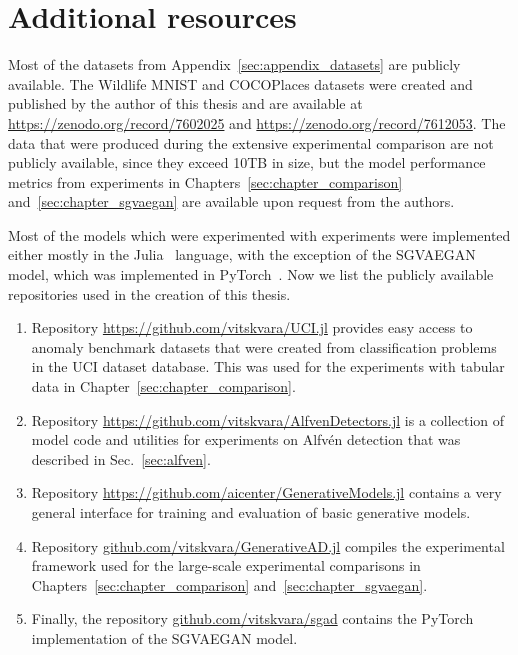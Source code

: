 \chapter{Additional resources} \label{sec:appendix_links}

Most of the datasets from Appendix~\ref{sec:appendix_datasets} are publicly available. The Wildlife MNIST and COCOPlaces datasets were created and published by the author of this thesis and are available at \url{https://zenodo.org/record/7602025} and \url{https://zenodo.org/record/7612053}. The data that were produced during the extensive experimental comparison are not publicly available, since they exceed 10TB in size, but the model performance metrics from experiments in Chapters~\ref{sec:chapter_comparison} and~\ref{sec:chapter_sgvaegan} are available upon request from the authors.

Most of the models which were experimented with experiments were implemented either mostly in the Julia~\cite{Julia-2017} language, with the exception of the SGVAEGAN model, which was implemented in PyTorch~\cite{NEURIPS2019_9015}. Now we list the publicly available repositories used in the creation of this thesis.

\begin{enumerate}
    \item Repository \url{https://github.com/vitskvara/UCI.jl} provides easy access to anomaly benchmark datasets that were created from classification problems in the UCI dataset database. This was used for the experiments with tabular data in Chapter~\ref{sec:chapter_comparison}.
    \item Repository \url{https://github.com/vitskvara/AlfvenDetectors.jl} is a collection of model code and utilities for experiments on Alfvén detection that was described in Sec.~\ref{sec:alfven}.
    \item Repository \url{https://github.com/aicenter/GenerativeModels.jl} contains a very general interface for training and evaluation of basic generative models.
    \item Repository \url{github.com/vitskvara/GenerativeAD.jl} compiles the experimental framework used for the large-scale experimental comparisons in Chapters~\ref{sec:chapter_comparison} and~\ref{sec:chapter_sgvaegan}.
    \item Finally, the repository \url{github.com/vitskvara/sgad} contains the PyTorch implementation of the SGVAEGAN model.
\end{enumerate}

